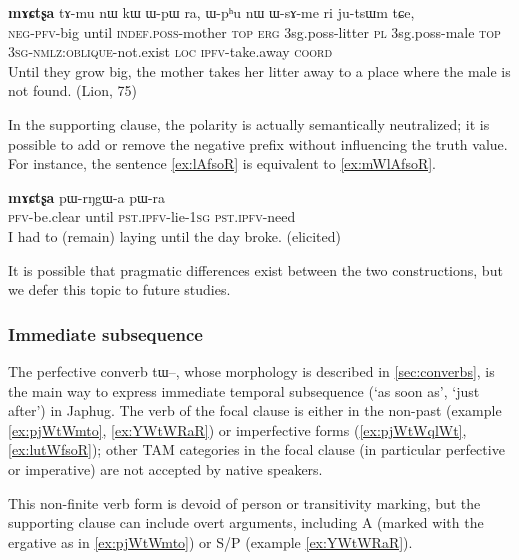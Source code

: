 \documentclass[oldfontcommands,oneside,a4paper,11pt]{article}
\newcommand{\ipa}[1]{{\phon \mbox{#1}}} %
\begin{document}
\begin{exe}
   \ex \label{ex:WsAme}
 \gll
[\ipa{mɯ-tʰɯ-wxti}]   	\textbf{\ipa{mɤɕtʂa}}  	\ipa{tɤ-mu}   	\ipa{nɯ}   	\ipa{kɯ}   	\ipa{ɯ-pɯ}   	\ipa{ra,}   	\ipa{ɯ-pʰu}   	\ipa{nɯ}   	\ipa{ɯ-sɤ-me}   	\ipa{ri}   	\ipa{ju-tsɯm}   	\ipa{tɕe,}   \\
\textsc{neg-pfv}-big until \textsc{indef.poss}-mother \textsc{top} \textsc{erg}  {3sg.poss}-litter \textsc{pl}  {3sg.poss}-male \textsc{top} \textsc{3sg-nmlz:oblique}-not.exist  \textsc{loc} \textsc{ipfv}-take.away \textsc{coord} \\
\glt  Until they grow big, the mother takes her litter away to a place where the male is not found. (Lion, 75)
  \end{exe}
  
In the supporting clause, the polarity is actually semantically neutralized; it is possible to add or remove the negative prefix without influencing the truth value. For instance, the sentence \ref{ex:lAfsoR} is equivalent to \ref{ex:mWlAfsoR}.

\begin{exe}
\ex \label{ex:lAfsoR}
\gll
[\ipa{lɤ-fsoʁ}]   	\textbf{\ipa{mɤɕtʂa}}   	\ipa{pɯ-rŋgɯ-a}   	\ipa{pɯ-ra}   \\
\textsc{pfv}-be.clear until \textsc{pst.ipfv}-lie-\textsc{1sg} \textsc{pst.ipfv}-need \\
\glt I had to (remain) laying until the day broke. (elicited)
\end{exe}

It is possible that pragmatic differences exist between the two constructions, but we defer this topic to future studies.

\subsubsection{Immediate subsequence}


The perfective converb \ipa{tɯ--},  whose morphology is described in \ref{sec:converbs}, is the main way to express immediate temporal subsequence  (`as soon as', `just after') in Japhug.   The verb of the focal clause is either in the non-past (example \ref{ex:pjWtWmto}, \ref{ex:YWtWRaR}) or imperfective forms (\ref{ex:pjWtWqlWt}, \ref{ex:lutWfsoR}); other TAM categories in the focal clause (in particular perfective or imperative) are not accepted by native speakers.

This non-finite verb form is devoid of person or transitivity marking, but the supporting clause can include overt arguments, including A (marked with the ergative as in \ref{ex:pjWtWmto}) or S/P (example \ref{ex:YWtWRaR}). 
\end{document}
